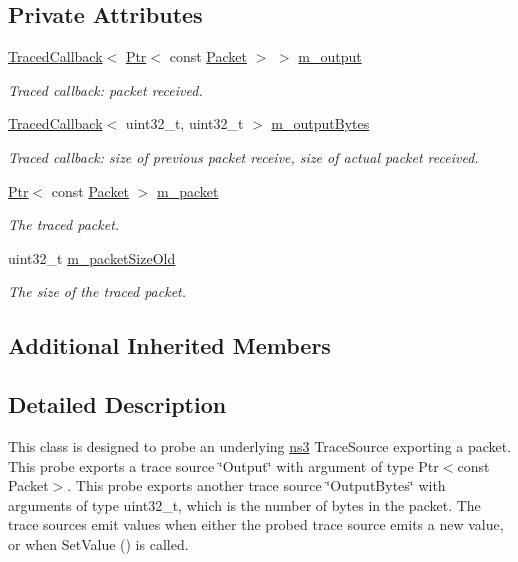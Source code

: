 \subsection*{Private Attributes}
\begin{DoxyCompactItemize}
\item 
\hyperlink{classns3_1_1TracedCallback}{Traced\+Callback}$<$ \hyperlink{classns3_1_1Ptr}{Ptr}$<$ const \hyperlink{classns3_1_1Packet}{Packet} $>$ $>$ \hyperlink{classns3_1_1PacketProbe_ac90f932731b8e93f8f9d202f072db2d6}{m\+\_\+output}
\begin{DoxyCompactList}\small\item\em Traced callback\+: packet received. \end{DoxyCompactList}\item 
\hyperlink{classns3_1_1TracedCallback}{Traced\+Callback}$<$ uint32\+\_\+t, uint32\+\_\+t $>$ \hyperlink{classns3_1_1PacketProbe_a22485607b7f497369b95649152fbab95}{m\+\_\+output\+Bytes}
\begin{DoxyCompactList}\small\item\em Traced callback\+: size of previous packet receive, size of actual packet received. \end{DoxyCompactList}\item 
\hyperlink{classns3_1_1Ptr}{Ptr}$<$ const \hyperlink{classns3_1_1Packet}{Packet} $>$ \hyperlink{classns3_1_1PacketProbe_af6ad2ec589eda870946880a0dc515d35}{m\+\_\+packet}
\begin{DoxyCompactList}\small\item\em The traced packet. \end{DoxyCompactList}\item 
uint32\+\_\+t \hyperlink{classns3_1_1PacketProbe_aba078a2a5cf2e954de40d29e851ff037}{m\+\_\+packet\+Size\+Old}
\begin{DoxyCompactList}\small\item\em The size of the traced packet. \end{DoxyCompactList}\end{DoxyCompactItemize}
\subsection*{Additional Inherited Members}


\subsection{Detailed Description}
This class is designed to probe an underlying \hyperlink{namespacens3}{ns3} Trace\+Source exporting a packet. This probe exports a trace source \char`\"{}\+Output\char`\"{} with argument of type Ptr$<$const Packet$>$. This probe exports another trace source \char`\"{}\+Output\+Bytes\char`\"{} with arguments of type uint32\+\_\+t, which is the number of bytes in the packet. The trace sources emit values when either the probed trace source emits a new value, or when Set\+Value () is called. 

